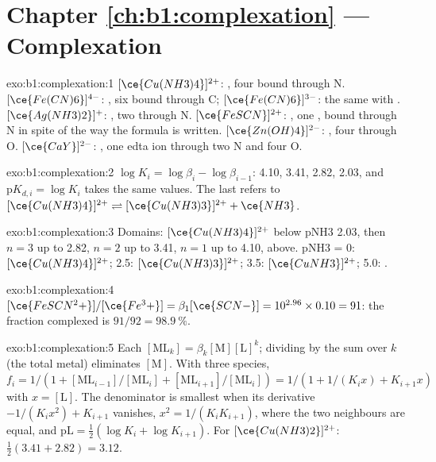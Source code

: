 \section*{Chapter \ref{ch:b1:complexation} --- Complexation}

\begin{solution}{exo:b1:complexation:1}
$[\ce{Cu(NH3)4}]^{2+}$: , four  bound through N.
$[\ce{Fe(CN)6}]^{4-}$: , six  bound through C;
$[\ce{Fe(CN)6}]^{3-}$: the same with . $[\ce{Ag(NH3)2}]^{+}$:
, two  through N. $[\ce{FeSCN}]^{2+}$: , one
, bound through N in spite of the way the formula is written.
$[\ce{Zn(OH)4}]^{2-}$: , four  through O.
$[\ce{CaY}]^{2-}$: , one edta ion through two N and four O.
\end{solution}

\begin{solution}{exo:b1:complexation:2}
$\log K_i = \log\beta_i - \log\beta_{i-1}$: 4.10, 3.41, 2.82, 2.03, and
$\mathrm{p}K_{d,i} = \log K_i$ takes the same values. The last refers to
$[\ce{Cu(NH3)4}]^{2+} \rightleftharpoons [\ce{Cu(NH3)3}]^{2+} + \ce{NH3}$.
\end{solution}

\begin{solution}{exo:b1:complexation:3}
Domains: $[\ce{Cu(NH3)4}]^{2+}$ below pNH3 2.03, then $n = 3$ up to 2.82,
$n = 2$ up to 3.41, $n = 1$ up to 4.10,  above. pNH3 = 0:
$[\ce{Cu(NH3)4}]^{2+}$; 2.5: $[\ce{Cu(NH3)3}]^{2+}$; 3.5:
$[\ce{CuNH3}]^{2+}$; 5.0: .
\end{solution}

\begin{solution}{exo:b1:complexation:4}
$[\ce{FeSCN^2+}]/[\ce{Fe^3+}] = \beta_1[\ce{SCN-}] = 10^{2.96} \times 0.10 =
91$: the fraction complexed is $91/92 = \qty{98.9}{\percent}$.
\end{solution}

\begin{solution}{exo:b1:complexation:5}
Each $[\mathrm{ML}_k] = \beta_k[\mathrm{M}][\mathrm{L}]^k$; dividing by the
sum over $k$ (the total metal) eliminates $[\mathrm{M}]$. With three
species, $f_i = 1/(1 + [\mathrm{ML}_{i-1}]/[\mathrm{ML}_i] +
[\mathrm{ML}_{i+1}]/[\mathrm{ML}_i]) = 1/(1 + 1/(K_i x) + K_{i+1}x)$ with
$x = [\mathrm{L}]$. The denominator is smallest when its derivative
$-1/(K_i x^2) + K_{i+1}$ vanishes, $x^2 = 1/(K_iK_{i+1})$, where the two
neighbours are equal, and $\mathrm{pL} = \frac12(\log K_i + \log K_{i+1})$.
For $[\ce{Cu(NH3)2}]^{2+}$: $\frac12(3.41 + 2.82) = 3.12$.
\end{solution}

